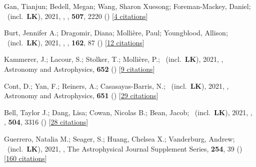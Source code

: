 \item[{\color{numcolor}\scriptsize58}] Gan, Tianjun; Bedell, Megan; Wang, Sharon Xuesong; Foreman-Mackey, Daniel; \etal\ (incl.\ \textbf{LK}), 2021, , \mnras, \textbf{507}, 2220 () [\href{https://ui.adsabs.harvard.edu/abs/2021MNRAS.507.2220G}{4 citations}]

\item[{\color{numcolor}\scriptsize57}] Burt, Jennifer A.; Dragomir, Diana; Molli{\`e}re, Paul; Youngblood, Allison; \etal\ (incl.\ \textbf{LK}), 2021, , \aj, \textbf{162}, 87 () [\href{https://ui.adsabs.harvard.edu/abs/2021AJ....162...87B}{12 citations}]

\item[{\color{numcolor}\scriptsize56}] Kammerer, J.; Lacour, S.; Stolker, T.; Molli{\`e}re, P.; \etal\ (incl.\ \textbf{LK}), 2021, , Astronomy and Astrophysics, \textbf{652} () [\href{https://ui.adsabs.harvard.edu/abs/2021A&A...652A..57K}{9 citations}]

\item[{\color{numcolor}\scriptsize55}] Cont, D.; Yan, F.; Reiners, A.; Casasayas-Barris, N.; \etal\ (incl.\ \textbf{LK}), 2021, , Astronomy and Astrophysics, \textbf{651} () [\href{https://ui.adsabs.harvard.edu/abs/2021A&A...651A..33C}{29 citations}]

\item[{\color{numcolor}\scriptsize54}] Bell, Taylor J.; Dang, Lisa; Cowan, Nicolas B.; Bean, Jacob; \etal\ (incl.\ \textbf{LK}), 2021, , \mnras, \textbf{504}, 3316 () [\href{https://ui.adsabs.harvard.edu/abs/2021MNRAS.504.3316B}{28 citations}]

\item[{\color{numcolor}\scriptsize53}] Guerrero, Natalia M.; Seager, S.; Huang, Chelsea X.; Vanderburg, Andrew; \etal\ (incl.\ \textbf{LK}), 2021, , The Astrophysical Journal Supplement Series, \textbf{254}, 39 () [\href{https://ui.adsabs.harvard.edu/abs/2021ApJS..254...39G}{160 citations}]

